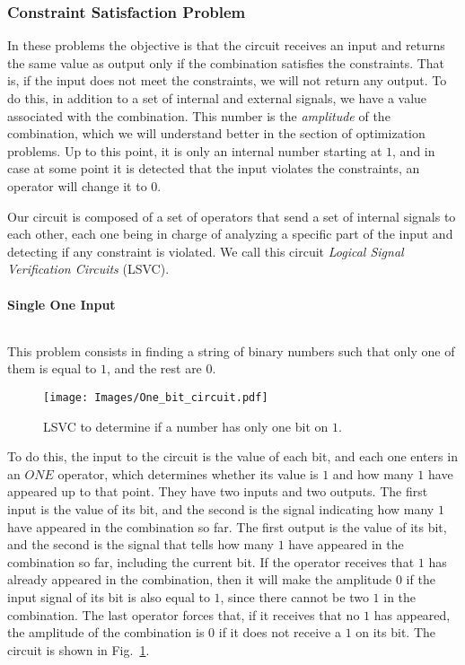 \subsubsection{Constraint Satisfaction Problem}
In these problems the objective is that the circuit receives an input and returns the same value as output only if the combination satisfies the constraints. That is, if the input does not meet the constraints, we will not return any output. To do this, in addition to a set of internal and external signals, we have a value associated with the combination. This number is the \textit{amplitude} of the combination, which we will understand better in the section of optimization problems. Up to this point, it is only an internal number starting at $1$, and in case at some point it is detected that the input violates the constraints, an operator will change it to $0$.

Our circuit is composed of a set of operators that send a set of internal signals to each other, each one being in charge of analyzing a specific part of the input and detecting if any constraint is violated. We call this circuit \textit{Logical Signal Verification Circuits} (LSVC).

\paragraph{Single One Input}
$ $

This problem consists in finding a string of binary numbers such that only one of them is equal to $1$, and the rest are $0$.
\begin{figure}[h]
    \centering
    \texttt{[image: Images/One\_bit\_circuit.pdf]}
    \caption{LSVC to determine if a number has only one bit on $1$.}
    \label{fig: One bit}
\end{figure}

To do this, the input to the circuit is the value of each bit, and each one enters in an $ONE$ operator, which determines whether its value is $1$ and how many $1$ have appeared up to that point. They have two inputs and two outputs. The first input is the value of its bit, and the second is the signal indicating how many $1$ have appeared in the combination so far. The first output is the value of its bit, and the second is the signal that tells how many $1$ have appeared in the combination so far, including the current bit. If the operator receives that $1$ has already appeared in the combination, then it will make the amplitude $0$ if the input signal of its bit is also equal to $1$, since there cannot be two $1$ in the combination. The last operator forces that, if it receives that no $1$ has appeared, the amplitude of the combination is $0$ if it does not receive a $1$ on its bit. The circuit is shown in Fig.~\ref{fig: One bit}.



